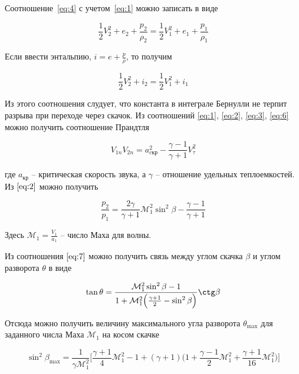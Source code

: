 \documentclass[12pt,a4paper,oneside]{book}
\newcommand*\Mach{\mathcal{M}}
\newcommand*\crit{\text{кр}}
\begin{document}
  \noindent Соотношение~\eqref{eq:4} с учетом~\eqref{eq:1} можно записать в виде
  
  \begin{equation}
    \label{eq:5}
    \frac{1}{2} V_2^2 + e_2 + \frac{p_2}{\rho_2}
      = \frac{1}{2} V_1^2 + e_1 + \frac{p_1}{\rho_1}
  \end{equation}
  
  \noindent Если ввести энтальпию, $i = e + \frac{p}{\rho}$, то получим
  
  \begin{equation}
    \label{eq:6}
    \frac{1}{2} V_2^2 + i_2 = \frac{1}{2} V_1^2 + i_1
  \end{equation}
  
  Из этого соотношения слудует, что константа в интеграле Бернулли не терпит
  разрыва при переходе через скачок. Из соотношений \eqref{eq:1}, \eqref{eq:2},
  \eqref{eq:3}, \eqref{eq:6} можно получить соотношение Прандтля
  
  \begin{equation}
    \label{eq:7}
    V_{1n} V_{2n} = a_{c\crit}^2 - \frac{\gamma - 1}{\gamma + 1} V_{\tau}^2
  \end{equation}
  
  \noindent где $a_{\crit}$ -- критическая скорость звука, а
  $\gamma$ -- отношение удельных теплоемкостей. Из $\eqref{eq:2}$
  можно получить
  
  \begin{equation}
    \frac{p_2}{p_1} = \frac{2 \gamma}{\gamma + 1}
      \Mach_1^2 \sin^2 \beta - \frac{\gamma - 1}{\gamma + 1}
  \end{equation}
  
  \noindent Здесь $\Mach_1 = \frac{V_1}{a_1}$ -- число Маха для волны.
  
  Из соотношения $\eqref{eq:7}$ можно получить связь между углом скачка
  $\beta$ и углом разворота $\theta$ в виде
  
  \begin{equation}
    \label{eq:9}
    \tan \theta = 
      \frac{
        \Mach_1^2 \sin^2 \beta - 1
      } {
        1 + \Mach_1^2
          \Big( \frac{\gamma + 1}{2} - \sin^2 \beta \Big)
      } \ctg \beta
  \end{equation}
  
  \noindent Отсюда можно получить величину максимального угла разворота
  $\theta_{\text{max}}$ для заданного числа Маха $\Mach_1$ на косом скачке
  
  \begin{equation}
    \label{eq:10}
    \sin^2 \beta_{\text{max}} = 
      \frac{1}{\gamma \Mach_1^2}
      \Big[
        \frac{\gamma + 1}{4} \Mach_1^2 - 1
        + (\gamma + 1)
          \big(
            1 + \frac{\gamma - 1}{2} \Mach_1^2
            + \frac{\gamma + 1}{16} \Mach_1^2
          \big)
      \Big]
  \end{equation}
  
\end{document}
